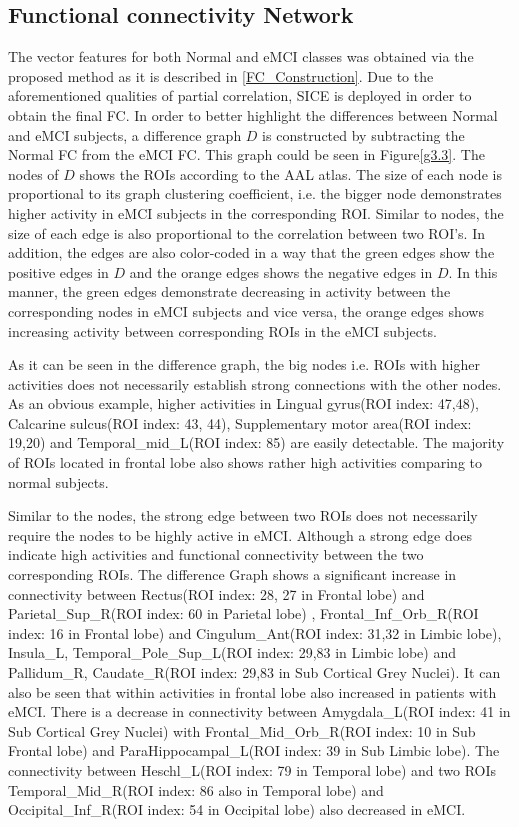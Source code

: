 \documentclass[preprint,12pt]{elsarticle}
\begin{document}
	\subsection{Functional connectivity Network}
	The vector features for both Normal and eMCI classes was obtained via the proposed method as it is described in \eqref{FC_Construction}. Due to the aforementioned qualities of partial correlation, SICE is deployed in order to obtain the final FC.  
	In order to better highlight the differences between Normal and eMCI subjects, a difference graph $D$ is constructed by subtracting the Normal FC from the eMCI FC. This graph could be seen in Figure\eqref{g3.3}. 
	The nodes of $D$ shows the ROIs according to the AAL atlas. The size of each node is proportional to its graph clustering coefficient, i.e. the bigger node demonstrates higher activity in eMCI subjects in the corresponding ROI. 
	Similar to nodes, the size of each edge is also proportional to the correlation between two ROI's. In addition, the edges are also color-coded in a way that the green edges show the positive edges in $D$ and the orange edges shows the negative edges in $D$. In this manner, the green edges demonstrate decreasing in activity between the corresponding nodes in eMCI subjects and vice versa, the orange edges shows increasing activity between corresponding ROIs in the eMCI subjects.   
	
	As it can be seen in the difference graph, the big nodes i.e. ROIs with higher activities does not necessarily establish strong connections with the other nodes. As an obvious example, higher activities in Lingual gyrus(ROI index: 47,48)\cite{r25}, Calcarine sulcus(ROI index: 43, 44)\cite{r26,r27}, Supplementary motor area(ROI index: 19,20)\cite{r27,r28} and Temporal\_mid\_L(ROI index: 85)\cite{r29} are easily detectable. The majority of ROIs located in frontal lobe also shows rather high activities comparing to normal subjects\cite{r30,r04}.
	
	Similar to the nodes, the strong edge between two ROIs does not necessarily require the nodes to be highly active in eMCI. Although a strong edge does indicate high activities and functional connectivity between the two corresponding ROIs. The difference Graph shows a significant increase in connectivity between 
	Rectus(ROI index: 28, 27 in Frontal lobe) and 
	Parietal\_Sup\_R(ROI index: 60 in Parietal lobe) \cite{r40, r41},
	Frontal\_Inf\_Orb\_R(ROI index: 16 in Frontal lobe) and
	Cingulum\_Ant(ROI index: 31,32 in Limbic lobe)\cite{r42},
	Insula\_L, Temporal\_Pole\_Sup\_L(ROI index: 29,83 in Limbic lobe) and
	Pallidum\_R, Caudate\_R(ROI index: 29,83 in Sub Cortical Grey Nuclei)\cite{r43}. It can also be seen that within activities in frontal lobe also increased in patients with eMCI\cite{r44}. There is a decrease in connectivity between Amygdala\_L(ROI index: 41 in Sub Cortical Grey Nuclei) with Frontal\_Mid\_Orb\_R(ROI index: 10 in Sub Frontal lobe) and ParaHippocampal\_L(ROI index: 39 in Sub Limbic lobe)\cite{r45}. The connectivity between Heschl\_L(ROI index: 79 in Temporal lobe) and two ROIs Temporal\_Mid\_R(ROI index: 86 also in Temporal lobe) and Occipital\_Inf\_R(ROI index: 54 in Occipital lobe) also decreased in eMCI\cite{r46}. 
	
\end{document}
